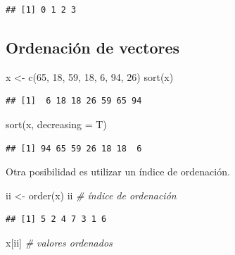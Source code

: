\documentclass[
]{book}
\newenvironment{Shaded}{\begin{snugshade}}{\end{snugshade}}
\newcommand{\AttributeTok}[1]{\textcolor[rgb]{0.77,0.63,0.00}{#1}}
\newcommand{\CommentTok}[1]{\textcolor[rgb]{0.56,0.35,0.01}{\textit{#1}}}
\newcommand{\DecValTok}[1]{\textcolor[rgb]{0.00,0.00,0.81}{#1}}
\newcommand{\FunctionTok}[1]{\textcolor[rgb]{0.00,0.00,0.00}{#1}}
\newcommand{\NormalTok}[1]{#1}
\newcommand{\OtherTok}[1]{\textcolor[rgb]{0.56,0.35,0.01}{#1}}
\theoremstyle{break}
\theoremstyle{nonumberplain}
\begin{document}
\begin{verbatim}
## [1] 0 1 2 3
\end{verbatim}

\hypertarget{ordenaciuxf3n-de-vectores}{%
\subsection{Ordenación de vectores}\label{ordenaciuxf3n-de-vectores}}

\begin{Shaded}
\begin{Highlighting}[]
\NormalTok{x }\OtherTok{\textless{}{-}} \FunctionTok{c}\NormalTok{(}\DecValTok{65}\NormalTok{, }\DecValTok{18}\NormalTok{, }\DecValTok{59}\NormalTok{, }\DecValTok{18}\NormalTok{, }\DecValTok{6}\NormalTok{, }\DecValTok{94}\NormalTok{, }\DecValTok{26}\NormalTok{)}
\FunctionTok{sort}\NormalTok{(x)}
\end{Highlighting}
\end{Shaded}

\begin{verbatim}
## [1]  6 18 18 26 59 65 94
\end{verbatim}

\begin{Shaded}
\begin{Highlighting}[]
\FunctionTok{sort}\NormalTok{(x, }\AttributeTok{decreasing =}\NormalTok{ T)}
\end{Highlighting}
\end{Shaded}

\begin{verbatim}
## [1] 94 65 59 26 18 18  6
\end{verbatim}

Otra posibilidad es utilizar un índice de ordenación.

\begin{Shaded}
\begin{Highlighting}[]
\NormalTok{ii }\OtherTok{\textless{}{-}} \FunctionTok{order}\NormalTok{(x)}
\NormalTok{ii  }\CommentTok{\# índice de ordenación}
\end{Highlighting}
\end{Shaded}

\begin{verbatim}
## [1] 5 2 4 7 3 1 6
\end{verbatim}

\begin{Shaded}
\begin{Highlighting}[]
\NormalTok{x[ii]  }\CommentTok{\# valores ordenados}
\end{Highlighting}
\end{Shaded}
\end{document}
